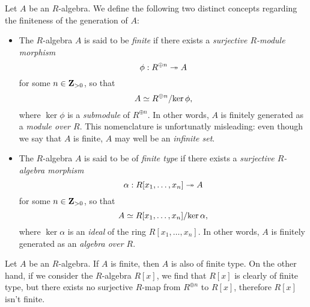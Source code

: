 \begin{definition}
\label{def:finite-generation-algebras}
Let \(A\) be an \(R\)-algebra. We define the following two distinct concepts
regarding the finiteness of the generation of \(A\):
\begin{itemize}[(a)]\setlength\itemsep{0em}
\item The \(R\)-algebra \(A\) is said to be \emph{finite} if there exists a
  \emph{surjective \(R\)-module morphism}
  \[
  \phi: R^{\oplus n} \twoheadrightarrow A
  \]
  for some \(n \in \mathbf{Z}_{>0}\), so that
  \[
  A \simeq R^{\oplus n}/{\ker \phi},
  \]
  where \(\ker \phi\) is a \emph{submodule} of \(R^{\oplus n}\). In other words,
  \(A\) is finitely generated as a \emph{module over \(R\)}. This nomenclature
  is unfortunatly misleading: even though we say that \(A\) is finite, \(A\) may
  well be an \emph{infinite set}.

\item The \(R\)-algebra \(A\) is said to be of \emph{finite type} if there
  exists a \emph{surjective \(R\)-algebra morphism}
  \[
  \alpha: R[x_1, \dots, x_n] \twoheadrightarrow A
  \]
  for some \(n \in \mathbf{Z}_{>0}\), so that
  \[
  A \simeq R[x_1, \dots, x_n]/{\ker \alpha},
  \]
  where \(\ker \alpha\) is an \emph{ideal} of the ring \(R[x_1, \dots,
  x_n]\). In other words, \(A\) is finitely generated as an \emph{algebra over
    \(R\)}.
\end{itemize}
\end{definition}

\begin{remark}
\label{rem:finite-type-not-finite}
Let \(A\) be an \(R\)-algebra. If \(A\) is finite, then \(A\) is also of finite
type. On the other hand, if we consider the \(R\)-algebra \(R[x]\), we find that
\(R[x]\) is clearly of finite type, but there exists no surjective \(R\)-map
from \(R^{\oplus n}\) to \(R[x]\), therefore \(R[x]\) isn't finite.
\end{remark}

